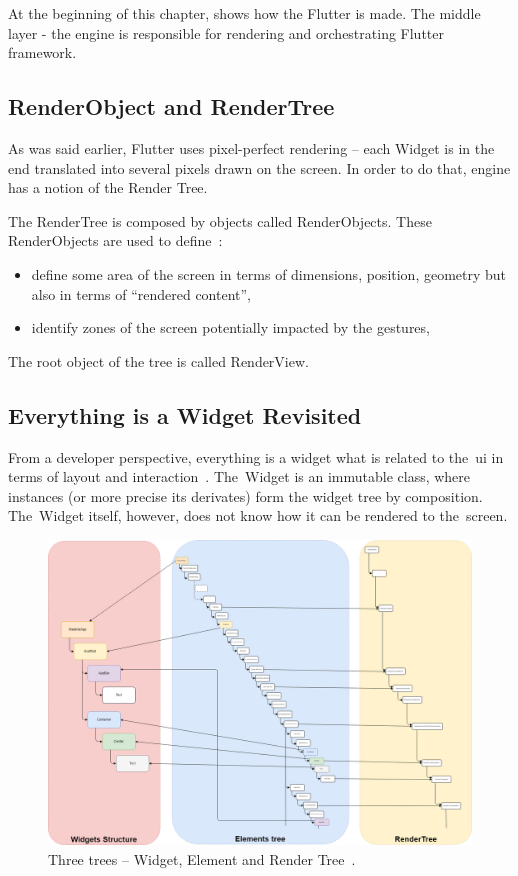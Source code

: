 At the beginning of this chapter,  shows how the Flutter is made. The middle layer - the engine is responsible for rendering and orchestrating Flutter framework. 
\subsection{RenderObject and RenderTree}
As was said earlier, Flutter uses pixel-perfect rendering -- each Widget is in the end translated into several pixels drawn on the screen. In order to do that, engine has a notion of the Render Tree.

The RenderTree is composed by objects called RenderObjects. These RenderObjects are used to define~\cite{didier-internals}:
\begin{itemize}
    \item define some area of the screen in terms of dimensions, position, geometry but also in terms of ``rendered content'',
    \item identify zones of the screen potentially impacted by the gestures,
\end{itemize}
The root object of the tree is called RenderView.
\subsection{Everything is a Widget Revisited}
From a developer perspective, everything is a widget what is related to the~\gls{ui} in terms of layout and interaction~\cite{didier-internals}. The~Widget is an immutable class, where instances (or more precise its derivates) form the widget tree by composition. The~Widget itself, however, does not know how it can be rendered to the~screen. 

\begin{figure}[ht]
    \centering
    \includegraphics[width=0.75\linewidth]{img/flutter/internals_3_trees.png}
    \caption{Three trees -- Widget, Element and Render Tree~\cite{didier-internals}.}
    \label{fig:flutter-internal-3-trees}
\end{figure}

